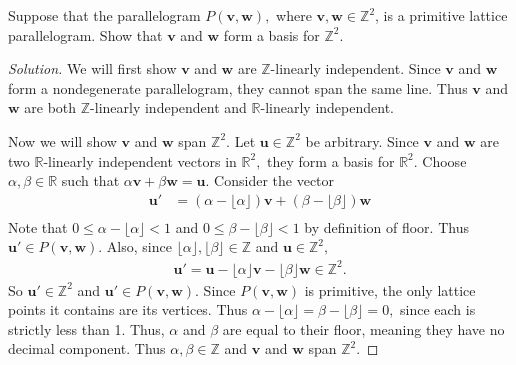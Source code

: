 \documentclass[12pt]{article}
\newcommand{\Z}{\mathbb{Z}}
\newcommand{\R}{\mathbb{R}}
\newenvironment{exercise}[2][Exercise]{\begin{trivlist}
        \item[\hskip \labelsep {\bfseries #1}\hskip \labelsep {\bfseries #2.}]}{\end{trivlist}}
\newenvironment{solution}
        {\begin{proof}[Solution]}
                    {\end{proof}}
\begin{document}
\begin{exercise}{41}
    Suppose that the parallelogram \( P(\mathbf{v, w}) , \) where \( \mathbf{v,w} \in \Z^{2} \), is a primitive lattice parallelogram. Show that \( \mathbf{v} \) and \( \mathbf{w} \) form a basis for \( \Z^{2} . \)
    \begin{solution}
        We will first show \( \mathbf{v} \) and \( \mathbf{w} \) are \( \Z \)-linearly independent. Since \( \mathbf{v} \) and \( \mathbf{w} \) form a nondegenerate parallelogram, they cannot span the same line. Thus \( \mathbf{v} \) and \( \mathbf{w} \) are both \( \Z \)-linearly independent and \( \R \)-linearly independent.

        Now we will show \( \mathbf{v} \) and \( \mathbf{w} \) span \( \Z^{2} . \) Let \( \mathbf{u} \in \Z^{2} \) be arbitrary. Since \( \mathbf{v} \) and \( \mathbf{w} \) are two \( \R \)-linearly independent vectors in \( \R^{2} , \) they form a basis for \( \R^{2} . \) Choose \( \alpha , \beta \in \R \) such that \( \alpha \mathbf{v} + \beta \mathbf{w} = \mathbf{u} . \) Consider the vector
        \begin{align*}
            \mathbf{u'} &= \left( \alpha - \lfloor \alpha \rfloor \right) \mathbf{v} + \left( \beta - \lfloor \beta \rfloor   \right)\mathbf{w} \\
        \end{align*}
        Note that \(0 \leq   \alpha - \lfloor \alpha \rfloor < 1 \) and \( 0 \leq \beta - \lfloor \beta \rfloor <  1  \) by definition of floor. Thus \( \mathbf{u'} \in P(\mathbf{v} , \mathbf{w}) \). Also, since \( \lfloor \alpha \rfloor , \lfloor \beta \rfloor \in \Z \) and \( \mathbf{u} \in \Z^{2} , \)
        \begin{align*}
            \mathbf{u'} = \mathbf{u} - \lfloor \alpha \rfloor \mathbf{v} - \lfloor \beta \rfloor \mathbf{w} \in \Z^{2}.
        \end{align*}
        So \( \mathbf{u'} \in \Z^{2} \) and \( \mathbf{u'} \in P(\mathbf{v} , \mathbf{w}) . \) Since \( P(\mathbf{v} , \mathbf{w}) \) is primitive, the only lattice points it contains are its vertices. Thus \( \alpha - \lfloor \alpha \rfloor = \beta - \lfloor \beta \rfloor = 0, \) since each is strictly less than 1. Thus, \(\alpha\) and \(\beta\) are equal to their floor, meaning they have no decimal component. Thus \( \alpha , \beta \in \Z \) and \( \mathbf{v} \) and \( \mathbf{w} \) span \( \Z^{2} . \)
    \end{solution}
\end{exercise}
\end{document}
